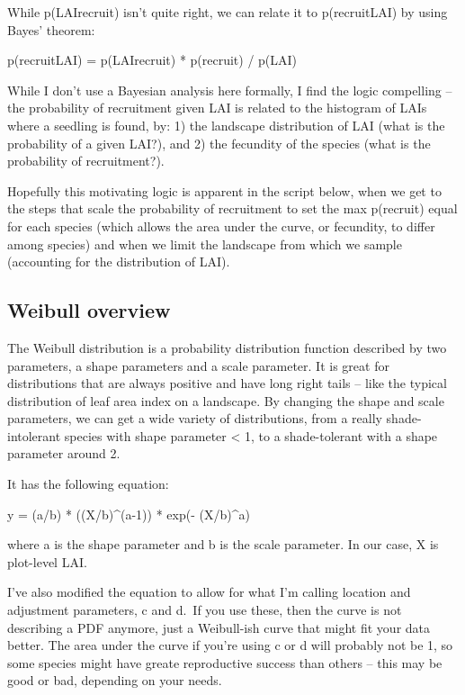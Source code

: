 \documentclass[
]{article}
\begin{document}
While p(LAI\textbar recruit) isn't quite right, we can relate it to
p(recruit\textbar LAI) by using Bayes' theorem:

p(recruit\textbar LAI) = p(LAI\textbar recruit) * p(recruit) / p(LAI)

While I don't use a Bayesian analysis here formally, I find the logic
compelling -- the probability of recruitment given LAI is related to the
histogram of LAIs where a seedling is found, by: 1) the landscape
distribution of LAI (what is the probability of a given LAI?), and 2)
the fecundity of the species (what is the probability of recruitment?).

Hopefully this motivating logic is apparent in the script below, when we
get to the steps that scale the probability of recruitment to set the
max p(recruit) equal for each species (which allows the area under the
curve, or fecundity, to differ among species) and when we limit the
landscape from which we sample (accounting for the distribution of LAI).

\subsection{Weibull overview}\label{weibull-overview}

The Weibull distribution is a probability distribution function
described by two parameters, a shape parameters and a scale parameter.
It is great for distributions that are always positive and have long
right tails -- like the typical distribution of leaf area index on a
landscape. By changing the shape and scale parameters, we can get a wide
variety of distributions, from a really shade-intolerant species with
shape parameter \textless{} 1, to a shade-tolerant with a shape
parameter around 2.

It has the following equation:

y = (a/b) * ((X/b)\^{}(a-1)) * exp(- (X/b)\^{}a)

where a is the shape parameter and b is the scale parameter. In our
case, X is plot-level LAI.

I've also modified the equation to allow for what I'm calling location
and adjustment parameters, c and d.~If you use these, then the curve is
not describing a PDF anymore, just a Weibull-ish curve that might fit
your data better. The area under the curve if you're using c or d will
probably not be 1, so some species might have greate reproductive
success than others -- this may be good or bad, depending on your needs.
\end{document}
